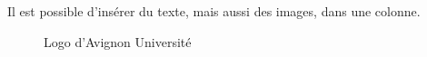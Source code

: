 \documentclass[10pt,    %
    french,             %
    xcolor=table,       %
    envcountsect,       %
    aspectratio=43      %
]{beamer}
\begin{document}
\begin{frame}
\begin{columns}[T,totalwidth=\textwidth]
        \begin{column}{0.33\textwidth}
            Il est possible d'insérer du texte, mais aussi des images, dans une colonne.
            \begin{figure}[H]
                \centering
                \href{http://univ-avignon.fr}{}
                \vspace{-0.5cm}
                \caption{Logo d'Avignon Université}
                \label{fig:AUlogo}
            \end{figure}
        \end{column}
    \end{columns}

        
\end{frame}
\end{document}
